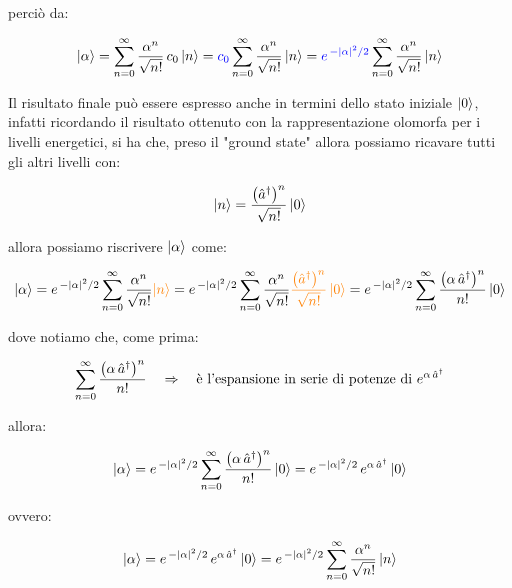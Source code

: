 	perciò da:

\begin{align*}
	\ket{\alpha} = \sum_{n= 0}^{\infty} \frac{\alpha^n}{\sqrt{n!}} \, c_0 \ket{n} = \textcolor{blue}{c_0} \sum_{n= 0}^{\infty} \frac{\alpha^n}{\sqrt{n!}} \ket{n} = \textcolor{blue}{e^{\, - |\alpha|^2/2} } \sum_{n= 0}^{\infty} \frac{\alpha^n}{\sqrt{n!}} \ket{n} 
\end{align*}

	Il risultato finale può essere espresso anche in termini dello stato iniziale $\ket{0}$, infatti ricordando il risultato ottenuto con la rappresentazione olomorfa per i livelli energetici, si ha che, preso il "ground state" allora possiamo ricavare tutti gli altri livelli con:
	
\begin{align*}
	\ket{n} = \frac{\qty(\hat{a}^{\dagger})^n}{\sqrt{n!}} \ket{0}
\end{align*}

	allora possiamo riscrivere $\ket{\alpha}$ come:

\begin{align*}
	\ket{\alpha} = e^{\, - |\alpha|^2/2}  \sum_{n= 0}^{\infty} \frac{\alpha^n}{\sqrt{n!}} \textcolor{orange}{\ket{n}} = e^{\, - |\alpha|^2/2}  \sum_{n= 0}^{\infty} \frac{\alpha^n}{\sqrt{n!}} \textcolor{orange}{  \frac{\qty(\hat{a}^{\dagger})^n}{\sqrt{n!}} \ket{0} } = e^{\, - |\alpha|^2/2}  \sum_{n= 0}^{\infty}\frac{\qty(\alpha \, \hat{a}^{\dagger})^n}{n!} \ket{0} 
\end{align*}

	dove notiamo che, come prima:
	
\begin{align*}
	\sum_{n= 0}^{\infty}\frac{\qty(\alpha \, \hat{a}^{\dagger})^n}{n!} \quad \Rightarrow \quad \text{è l'espansione in serie di potenze di $e^{\alpha \, \hat{a}^{\dagger}}$}
\end{align*}

	allora:

\begin{align*}
	\ket{\alpha} = e^{\, - |\alpha|^2/2}  \sum_{n= 0}^{\infty}\frac{\qty(\alpha \, \hat{a}^{\dagger})^n}{n!} \ket{0}  = e^{\, - |\alpha|^2/2} \, e^{\alpha \, \hat{a}^{\dagger}} \ket{0} 
\end{align*}
	
	ovvero:

\begin{nb}
\begin{align*}
	\ket{\alpha} = e^{\, - |\alpha|^2/2} \, e^{\alpha \, \hat{a}^{\dagger}} \ket{0} = e^{\, - |\alpha|^2/2} \sum_{n = 0}^{\infty} \frac{\alpha^n}{\sqrt{n!}} \ket{n}
\end{align*}
\end{nb}
	

